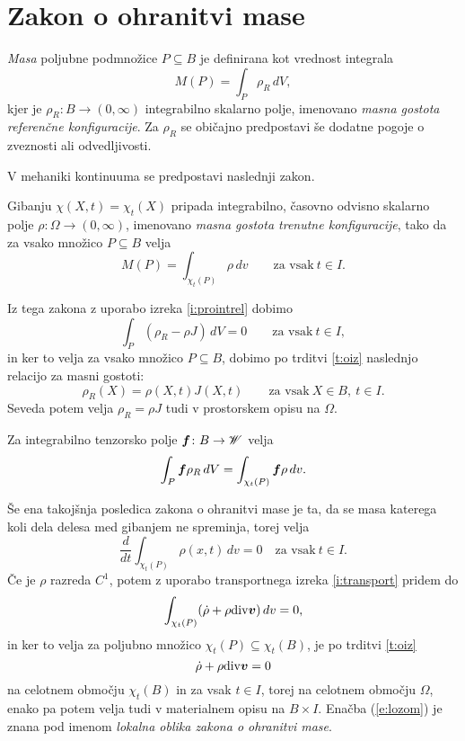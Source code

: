 \section{Zakon o ohranitvi mase}


\emph{Masa} poljubne podmnožice $P\subseteq B$ je definirana kot vrednost integrala
\[ M(P)=\int_P\rho_R\,dV, \]
kjer je $\rho_R\colon B\to(0,\infty)$ integrabilno skalarno polje, imenovano
\emph{masna gostota referenčne konfiguracije}.
Za $\rho_R$ se običajno predpostavi še dodatne pogoje o zveznosti ali odvedljivosti.

\begin{comment}
Poljubni konfiguraciji materialnega telesa $\kappa\colon B\to\E$ pripada
integrabilno skalarno polje $\rho_{\kappa}\colon B\to(0,\infty)$, imenovano
\emph{masna gostota konfiguracije $\kappa$}, tako da za vsako množico $P\subseteq B$ velja
\[ M(P)=\int_{\kappa(P)}\rho_{\kappa}\,dv. \]
\end{comment}

V mehaniki kontinuuma se predpostavi naslednji zakon.
\begin{aksiom}
	Gibanju $\chi(X,t)=\chi_t(X)$ pripada integrabilno, časovno odvisno skalarno polje
	$\rho\colon\Omega\to(0,\infty)$, imenovano \emph{masna gostota trenutne konfiguracije},
	tako da za vsako množico $P\subseteq B$ velja
	\[ M(P)=\int_{\chi_t(P)}\rho\,dv\qquad\textrm{za vsak}\ t\in I. \]
\end{aksiom}

Iz tega zakona z uporabo izreka \ref{i:prointrel} dobimo
\[ \int_{P}(\rho_R-\rho J)\,dV=0 \qquad\textrm{za vsak}\ t\in I, \]
in ker to velja za vsako množico $P\subseteq B$, dobimo po trditvi \ref{t:oiz}
naslednjo relacijo za masni gostoti:
\begin{equation} \label{e:rojror}
	\rho_R(X)=\rho(X,t)J(X,t)\qquad\textrm{za vsak}\ X\in B,\ t\in I.
\end{equation}
Seveda potem velja $\rho_R=\rho J$ tudi v prostorskem opisu na $\Omega$.

\begin{posledica} \label{p:roji}
	Za integrabilno tenzorsko polje $\boldsymbol f\colon B\to\mathscr W$ velja
	\[
		\int_{P}\boldsymbol f\rho_R\,dV=\int_{\chi_t(P)}\boldsymbol f\rho\,dv.
	\]
\end{posledica}

Še ena takojšnja posledica zakona o ohranitvi mase je ta, da se masa katerega koli
dela delesa med gibanjem ne spreminja, torej velja
\[ \frac{d}{dt}\int_{\chi_t(P)}\rho(x,t)\,dv = 0\quad\textrm{za vsak}\ t\in I. \]
Če je $\rho$ razreda $C^1$, potem z uporabo transportnega izreka \ref{i:transport}
pridem do
\[ \int_{\chi_t(P)}(\dot{\rho}+\rho\mathrm{div}\boldsymbol v)\,dv=0, \]
in ker to velja za poljubno množico $\chi_t(P)\subseteq\chi_t(B)$, je po trditvi \ref{t:oiz}
\begin{equation} \label{e:lozom}
	\dot{\rho}+\rho\mathrm{div}\boldsymbol v=0
\end{equation}
na celotnem območju $\chi_t(B)$ in za vsak $t\in I$, torej na celotnem območju $\Omega$,
enako pa potem velja tudi v materialnem opisu na $B\times I$.
Enačba (\ref{e:lozom}) je znana pod imenom \emph{lokalna oblika zakona o ohranitvi mase}.

